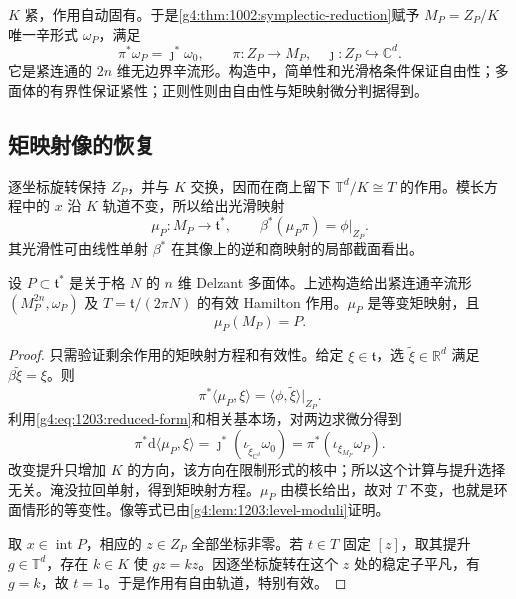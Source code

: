 \(K\) 紧，作用自动固有。于是\cref{g4:thm:1002:symplectic-reduction}赋予 \(M_P=Z_P/K\) 唯一辛形式 \(\omega_P\)，满足
\begin{equation}\label{g4:eq:1203:reduced-form}
	\pi^*\omega_P=\jmath^*\omega_0,\qquad
	\pi:Z_P\to M_P,\quad \jmath:Z_P\hookrightarrow\mathbb C^d.
\end{equation}
它是紧连通的 \(2n\) 维无边界辛流形。构造中，简单性和光滑格条件保证自由性；多面体的有界性保证紧性；正则性则由自由性与矩映射微分判据得到。

\subsection{矩映射像的恢复}
\label{g4:subsec:1203:04}

逐坐标旋转保持 \(Z_P\)，并与 \(K\) 交换，因而在商上留下
\(\mathbb T^d/K\cong T\) 的作用。模长方程中的 \(x\) 沿 \(K\) 轨道不变，所以给出光滑映射
\begin{equation}\label{g4:eq:1203:residual-moment}
	\mu_P:M_P\longrightarrow\mathfrak t^*,\qquad
	\beta^*(\mu_P\pi)=\phi|_{Z_P}.
\end{equation}
其光滑性可由线性单射 \(\beta^*\) 在其像上的逆和商映射的局部截面看出。

\begin{theorem}[Delzant 构造]\label{g4:thm:1203:delzant-construction}
	设 \(P\subset\mathfrak t^*\) 是关于格 \(N\) 的 \(n\) 维 Delzant 多面体。上述构造给出紧连通辛流形 \((M_P^{2n},\omega_P)\) 及 \(T=\mathfrak t/(2\pi N)\) 的有效 Hamilton 作用。\(\mu_P\) 是等变矩映射，且
	\[
		\mu_P(M_P)=P.
	\]
\end{theorem}
\begin{proof}
	只需验证剩余作用的矩映射方程和有效性。给定 \(\xi\in\mathfrak t\)，选 \(\widetilde\xi\in\mathbb R^d\) 满足 \(\beta\widetilde\xi=\xi\)。则
	\[
		\pi^*\langle\mu_P,\xi\rangle
		=\langle\phi,\widetilde\xi\rangle|_{Z_P}.
	\]
	利用\eqref{g4:eq:1203:reduced-form}和相关基本场，对两边求微分得到
	\[
		\pi^*\mathrm{d}\langle\mu_P,\xi\rangle
		=\jmath^*(\iota_{\widetilde\xi_{\mathbb C^d}}\omega_0)
		=\pi^*(\iota_{\xi_{M_P}}\omega_P).
	\]
	改变提升只增加 \(K\) 的方向，该方向在限制形式的核中；所以这个计算与提升选择无关。淹没拉回单射，得到矩映射方程。\(\mu_P\) 由模长给出，故对 \(T\) 不变，也就是环面情形的等变性。像等式已由\cref{g4:lem:1203:level-moduli}证明。

	取 \(x\in\operatorname{int}P\)，相应的 \(z\in Z_P\) 全部坐标非零。若 \(t\in T\) 固定 \([z]\)，取其提升 \(g\in\mathbb T^d\)，存在 \(k\in K\) 使 \(gz=kz\)。因逐坐标旋转在这个 \(z\) 处的稳定子平凡，有 \(g=k\)，故 \(t=1\)。于是作用有自由轨道，特别有效。
\end{proof}

